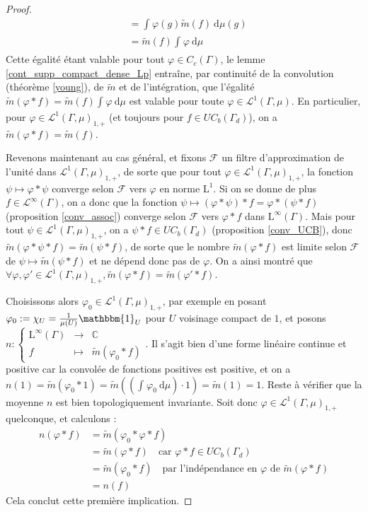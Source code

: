 \documentclass[a4paper,12pt]{article}
\newcommand{\C}{\mathbb{C}}
\newcommand{\indic}{\mathbbm{1}}
\newcommand{\integral}[4]{\int_{#1}^{#2} #3~\mathrm{d}#4}
\newcommand\fundef[3]{#1: \left\{\begin{array}{ccc}#2\\#3\end{array}\right.}
\begin{document}
\begin{proof}
\begin{align*}
            &= \integral{}{}{\varphi(g)\widetilde{m}(f)}{\mu(g)} \\
            &= \widetilde{m}(f)\integral{}{}{\varphi}{\mu}
    \end{align*}
    Cette égalité étant valable pour tout $\varphi\in C_c(\Gamma)$, le lemme \ref{cont_supp_compact_dense_Lp} entraîne, par continuité de la convolution (théorème \ref{young}),
    de $\widetilde{m}$ et de l'intégration, que l'égalité $\widetilde{m}(\varphi\ast f) = \widetilde{m}(f)\integral{}{}{\varphi}{\mu}$ est valable 
    pour toute $\varphi\in\mathscr{L}^1(\Gamma, \mu)$. En particulier, pour $\varphi\in\mathscr{L}^1(\Gamma, \mu)_{1, +}$ (et toujours pour 
    $f\in UC_b(\Gamma_d)$), on a $\widetilde{m}(\varphi\ast f) = \widetilde{m}(f)$.
    
    Revenons maintenant au cas général, et fixons $\mathscr{F}$ un filtre d'approximation de l'unité 
    dans $\mathscr{L}^1(\Gamma, \mu)_{1, +}$, de sorte que pour tout $\varphi\in\mathscr{L}^1(\Gamma, \mu)_{1, +}$, la fonction 
    $\psi\mapsto\varphi\ast\psi$ converge selon $\mathscr{F}$ vers $\varphi$ en norme $\mathrm{L}^1$. 
    Si on se donne de plus $f\in\mathscr{L}^\infty(\Gamma)$, on a donc que la fonction $\psi\mapsto(\varphi\ast\psi)\ast f = \varphi\ast(\psi\ast f)$
    (proposition \ref{conv_assoc}) converge selon $\mathscr{F}$ vers $\varphi\ast f$ dans $\mathrm{L}^\infty(\Gamma)$. Mais pour tout $\psi\in\mathscr{L}^1(\Gamma, \mu)_{1, +}$, on
    a $\psi\ast f\in UC_b(\Gamma_d)$ (proposition \ref{conv_UCB}), donc $\widetilde{m}(\varphi\ast\psi\ast f) = \widetilde{m}(\psi\ast f)$,
    de sorte que le nombre $\widetilde{m}(\varphi\ast f)$ est limite selon $\mathscr{F}$ de $\psi\mapsto\widetilde{m}(\psi\ast f)$ et 
    ne dépend donc pas de $\varphi$. On a ainsi montré que $\forall\varphi, \varphi'\in\mathscr{L}^1(\Gamma, \mu)_{1, +}, \widetilde{m}(\varphi\ast f) = \widetilde{m}(\varphi'\ast f)$.

    Choisissons alors $\varphi_0\in\mathscr{L}^1(\Gamma, \mu)_{1, +}$, par exemple en posant $\varphi_0:=\chi_U=\frac{1}{\mu(U)}\indic_U$ pour 
    $U$ voisinage compact de $1$, et posons $\fundef{n}{\mathrm{L}^\infty(\Gamma)&\to&\C}{f&\mapsto&\widetilde{m}(\varphi_0\ast f)}$. Il s'agit bien d'une 
    forme linéaire continue et positive car la convolée de fonctions positives est positive, et on a $n(1)=\widetilde{m}(\varphi_0\ast 1) = \widetilde{m}\left(\left(\integral{}{}{\varphi_0}{\mu}\right)\cdot 1\right) = \widetilde{m}(1) = 1$.
    Reste à vérifier que la moyenne $n$ est bien topologiquement invariante. Soit donc $\varphi\in\mathscr{L}^1(\Gamma, \mu)_{1, +}$ quelconque, et calculons :
    \begin{align*}
        n(\varphi\ast f) 
            &= \widetilde{m}(\varphi_0\ast\varphi\ast f) \\
            &= \widetilde{m}(\varphi\ast f) \quad\text{car } \varphi\ast f\in UC_b(\Gamma_d)\\
            &= \widetilde{m}(\varphi_0\ast f) \quad\text{par l'indépendance en $\varphi$ de $\widetilde{m}(\varphi\ast f)$} \\
            &= n(f)
    \end{align*}
    Cela conclut cette première implication. 


\end{proof}
\end{document}
